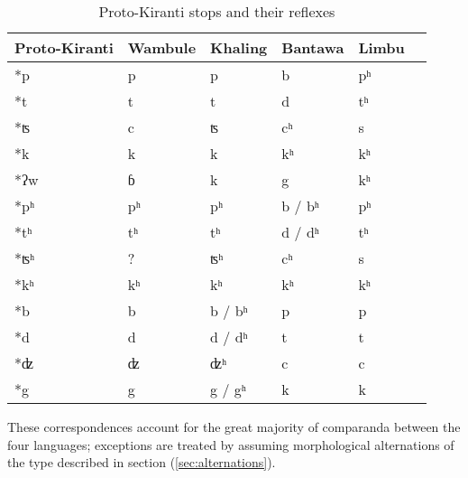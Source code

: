 \documentclass[oneside,a4paper,11pt]{article}
\newcommand{\ipa}[1]{{\phon\mbox{#1}}} %
\begin{document}
\begin{table}[h]
\caption{Proto-Kiranti stops and their reflexes} \centering \label{tab:stops}
\begin{tabular}{llllll}
\toprule
Proto-Kiranti & Wambule & Khaling & Bantawa & Limbu \\
\midrule
\ipa{*p} & \ipa{p} & \ipa{p} & \ipa{b} & \ipa{pʰ}  \\
\ipa{*t} & \ipa{t} & \ipa{t} & \ipa{d} & \ipa{tʰ}  \\
\ipa{*ʦ} & \ipa{c} & \ipa{ʦ} & \ipa{cʰ} & \ipa{s}  \\
\ipa{*k} & \ipa{k} & \ipa{k} & \ipa{kʰ} & \ipa{kʰ}  \\
\midrule
\ipa{*ʔw} & \ipa{ɓ} & \ipa{k} & \ipa{g} & \ipa{kʰ}  \\
\midrule
\ipa{*pʰ} & \ipa{pʰ} & \ipa{pʰ} & \ipa{b} / \ipa{bʰ}  & \ipa{pʰ}  \\
\ipa{*tʰ} & \ipa{tʰ} & \ipa{tʰ} & \ipa{d} / \ipa{dʰ} & \ipa{tʰ}  \\
\ipa{*ʦʰ} & ? & \ipa{ʦʰ} & \ipa{cʰ}  & \ipa{s}  \\
\ipa{*kʰ} & \ipa{kʰ} & \ipa{kʰ} & \ipa{kʰ} & \ipa{kʰ}  \\
\midrule
\ipa{*b} & \ipa{b} &\ipa{b} / \ipa{bʰ}  & \ipa{p} & \ipa{p}  \\
\ipa{*d} & \ipa{d} & \ipa{d} / \ipa{dʰ}  & \ipa{t} & \ipa{t}  \\
\ipa{*ʣ} & \ipa{ʣ} & \ipa{ʣʰ} & \ipa{c} & \ipa{c}  \\
\ipa{*g} & \ipa{g} & \ipa{g} / \ipa{gʰ}  & \ipa{k} & \ipa{k}  \\
\bottomrule
\end{tabular}
\end{table}
These correspondences account for the great majority of comparanda between the four languages; exceptions are treated by assuming  morphological alternations of the type described in section (\ref{sec:alternations}).
\end{document}
